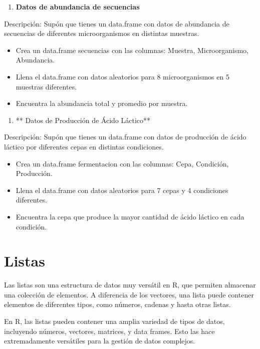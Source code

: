 \documentclass[
]{book}
\providecommand{\tightlist}{%
  \setlength{\itemsep}{0pt}\setlength{\parskip}{0pt}}
\begin{document}
\begin{enumerate}
\def\labelenumi{\arabic{enumi}.}
\setcounter{enumi}{2}
\tightlist
\item
  \textbf{Datos de abundancia de secuencias}
\end{enumerate}

Descripción: Supón que tienes un data.frame con datos de abundancia de secuencias de diferentes microorganismos en distintas muestras.

\begin{itemize}
\tightlist
\item
  Crea un data.frame secuencias con las columnas: Muestra, Microorganismo, Abundancia.
\item
  Llena el data.frame con datos aleatorios para 8 microorganismos en 5 muestras diferentes.
\item
  Encuentra la abundancia total y promedio por muestra.
\end{itemize}

\begin{enumerate}
\def\labelenumi{\arabic{enumi}.}
\setcounter{enumi}{3}
\tightlist
\item
  ** Datos de Producción de Ácido Láctico**
\end{enumerate}

Descripción: Supón que tienes un data.frame con datos de producción de ácido láctico por diferentes cepas en distintas condiciones.

\begin{itemize}
\tightlist
\item
  Crea un data.frame fermentacion con las columnas: Cepa, Condición, Producción.
\item
  Llena el data.frame con datos aleatorios para 7 cepas y 4 condiciones diferentes.
\item
  Encuentra la cepa que produce la mayor cantidad de ácido láctico en cada condición.
\end{itemize}

\chapter{Listas}\label{Listas}

Las listas son una estructura de datos muy versátil en R, que permiten almacenar una colección de elementos. A diferencia de los vectores, una lista puede contener elementos de diferentes tipos, como números, cadenas y hasta otras listas.

En R, las listas pueden contener una amplia variedad de tipos de datos, incluyendo números, vectores, matrices, y data frames. Esto las hace extremadamente versátiles para la gestión de datos complejos.
\end{document}
